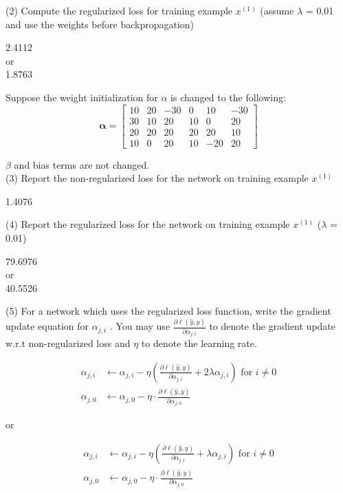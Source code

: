 (2) Compute the regularized loss for training example $x^{(1)}$ (assume $\lambda$ = 0.01 and use the weights before backpropagation)
\begin{tcolorbox}[fit,height=1cm, width=2cm, blank, borderline={1pt}{-2pt}]
2.4112 \\
or \\
1.8763
\end{tcolorbox}

Suppose the weight initialization for $\alpha$ is changed to the following:
$$\boldsymbol{\alpha}=
\begin{bmatrix}
10 & 20 & -30 & 0 & 10 & -30 \\
30 & 10 & 20 & 10 & 0 & 20 \\
20 & 20 & 20 & 20 & 20 & 10 \\
10 & 0 & 20 & 10 & -20 & 20
\end{bmatrix}$$

$\beta$ and bias terms are not changed. \\

(3) Report the non-regularized loss for the network on training example $x^{(1)}$
\begin{tcolorbox}[fit,height=1cm, width=2cm, blank, borderline={1pt}{-2pt}]
1.4076
\end{tcolorbox}

(4) Report the regularized loss for the network on training example $x^{(1)}$ ($\lambda$ = 0.01)
\begin{tcolorbox}[fit,height=1cm, width=2cm, blank, borderline={1pt}{-2pt}]
79.6976 \\
or \\
40.5526
\end{tcolorbox}

(5) For a network which uses the regularized loss function, write the gradient update equation for $\alpha_{j,i}$ . You may use $\frac{\partial \ell(\hat{y},y)}{\partial \alpha_{j,i}}$ to denote the gradient update w.r.t non-regularized loss and $\eta$ to denote the learning rate.
\begin{tcolorbox}[fit,height=3cm, width=10cm, blank, borderline={1pt}{-2pt}]
\begin{align*}
\alpha_{j,i} &\gets \alpha_{j,i} - \eta\left(\frac{\partial \ell(\hat{y},y)}{\partial \alpha_{j,i}} + 2\lambda\alpha_{j,i}\right) \text{ for } i\neq 0 \\
\alpha_{j,0} &\gets \alpha_{j,0} - \eta\cdot\frac{\partial \ell(\hat{y},y)}{\partial \alpha_{j,0}}
\end{align*}
\end{tcolorbox}
or
\begin{tcolorbox}[fit,height=3cm, width=10cm, blank, borderline={1pt}{-2pt}]
\begin{align*}
\alpha_{j,i} &\gets \alpha_{j,i} - \eta\left(\frac{\partial \ell(\hat{y},y)}{\partial \alpha_{j,i}} + \lambda\alpha_{j,i}\right) \text{ for } i\neq 0 \\
\alpha_{j,0} &\gets \alpha_{j,0} - \eta\cdot\frac{\partial \ell(\hat{y},y)}{\partial \alpha_{j,0}}
\end{align*}
\end{tcolorbox}

